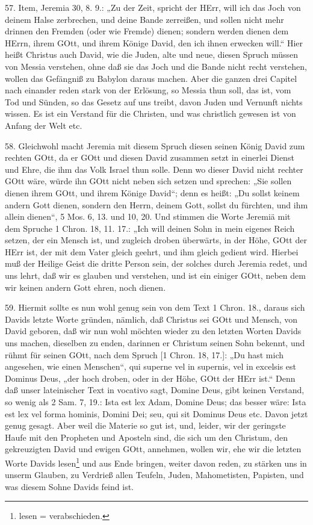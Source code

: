 57. Item, Jeremia 30, 8. 9.: „Zu der Zeit, spricht der HErr, will ich das Joch von deinem Halse zerbrechen, und deine Bande zerreißen, und sollen nicht mehr drinnen den Fremden (oder wie Fremde) dienen; sondern werden dienen dem HErrn, ihrem GOtt, und ihrem Könige David, den ich ihnen erwecken will.“ Hier heißt Christus auch David, wie die Juden, alte und neue, diesen Spruch müssen von Messia verstehen, ohne daß sie das Joch und die Bande nicht recht verstehen, wollen das Gefängniß zu Babylon daraus machen. Aber die ganzen drei Capitel nach einander reden stark von der Erlösung, so Messia thun soll, das ist, vom Tod und Sünden, so das Gesetz auf uns treibt, davon Juden und Vernunft nichts wissen. Es ist ein Verstand für die Christen, und was christlich gewesen ist von Anfang der Welt etc.

58. Gleichwohl macht Jeremia mit diesem Spruch diesen seinen König David zum rechten GOtt, da er GOtt und diesen David zusammen setzt in einerlei Dienst und Ehre, die ihm das Volk Israel thun solle. Denn wo dieser David nicht rechter GOtt wäre, würde ihn GOtt nicht neben sich setzen und sprechen: „Sie sollen dienen ihrem GOtt, und ihrem Könige David“; denn es heißt: „Du sollst keinem andern Gott dienen, sondern den Herrn, deinem Gott, sollst du fürchten, und ihm allein dienen“, 5 Mos. 6, 13. und 10, 20. Und stimmen die Worte Jeremiä mit dem Spruche 1 Chron. 18, 11. 17.: „Ich will deinen Sohn in mein eigenes Reich setzen, der ein Mensch ist, und zugleich droben überwärts, in der Höhe, GOtt der HErr ist, der mit dem Vater gleich geehrt, und ihm gleich gedient wird. Hierbei muß der Heilige Geist die dritte Person sein, der solches durch Jeremia redet, und uns lehrt, daß wir es glauben und verstehen, und ist ein einiger GOtt, neben dem wir keinen andern Gott ehren, noch dienen.

59. Hiermit sollte es nun wohl genug sein von dem Text 1 Chron. 18., daraus sich Davids letzte Worte gründen, nämlich, daß Christus sei GOtt und Mensch, von David geboren, daß wir nun wohl möchten wieder zu den letzten Worten Davids uns machen, dieselben zu enden, darinnen er Christum seinen Sohn bekennt, und rühmt für seinen GOtt, nach dem Spruch [1 Chron. 18, 17.]: „Du hast mich angesehen, wie einen Menschen“, qui superne vel in supernis, vel in excelsis est Dominus Deus, „der hoch droben, oder in der Höhe, GOtt der HErr ist.“ Denn daß unser lateinischer Text in vocativo sagt, Domine Deus, gibt keinen Verstand, so wenig als 2 Sam. 7, 19.: Ista est lex Adam, Domine Deus; das besser wäre: Ista est lex vel forma hominis, Domini Dei; seu, qui sit Dominus Deus etc. Davon jetzt genug gesagt. Aber weil die Materie so gut ist, und, leider, wir der geringste Haufe mit den Propheten und Aposteln sind, die sich um den Christum, den gekreuzigten David und ewigen GOtt, annehmen, wollen wir, ehe wir die letzten Worte Davids lesen\footnote{lesen = verabschieden.} und aus Ende bringen, weiter davon reden, zu stärken uns in unserm Glauben, zu Verdrieß allen Teufeln, Juden, Mahometisten, Papisten, und was diesem Sohne Davids feind ist.

